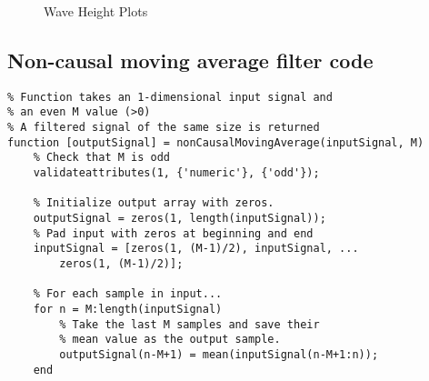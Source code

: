 \documentclass[titlepage]{scrartcl}
\begin{document}
    \begin{figure}[H]
        \caption{Wave Height Plots}
    \end{figure}

    \subsection*{Non-causal moving average filter code}
    \begin{lstlisting}
% Function takes an 1-dimensional input signal and
% an even M value (>0) 
% A filtered signal of the same size is returned
function [outputSignal] = nonCausalMovingAverage(inputSignal, M)
    % Check that M is odd
    validateattributes(1, {'numeric'}, {'odd'});

    % Initialize output array with zeros.
    outputSignal = zeros(1, length(inputSignal));
    % Pad input with zeros at beginning and end
    inputSignal = [zeros(1, (M-1)/2), inputSignal, ...
        zeros(1, (M-1)/2)];

    % For each sample in input...
    for n = M:length(inputSignal)
        % Take the last M samples and save their
        % mean value as the output sample.
        outputSignal(n-M+1) = mean(inputSignal(n-M+1:n));
    end
    \end{lstlisting}


\end{document}
